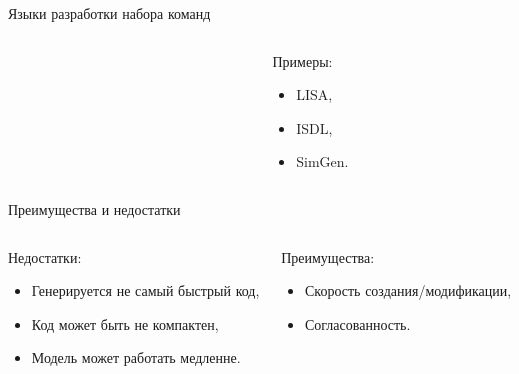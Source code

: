 \begin{frame}{Языки разработки набора команд}

\begin{columns}[t]
    \begin{column}[T]{0.7\textwidth}
    \begin{figure}
        \centering
    \end{figure}
    \end{column}

    \begin{column}[T]{0.3\textwidth}
        Примеры:
        \begin{itemize}
            \item LISA,
            \item ISDL,
            \item SimGen.
        \end{itemize}
    \end{column}
\end{columns}

\end{frame}

\begin{frame}{Преимущества и недостатки}

\begin{columns}[t]
    \begin{column}[T]{0.5\textwidth}
    Недостатки:
    \begin{itemize}
        \item Генерируется не самый быстрый код,
        \item Код может быть не компактен,
        \item Модель может работать медленне.
    \end{itemize}
    \end{column}
    \begin{column}[T]{0.5\textwidth}
    Преимущества:
    \begin{itemize}
        \item Скорость создания/модификации,
        \item Согласованность.
    \end{itemize}
    \end{column}
\end{columns}

\end{frame}

